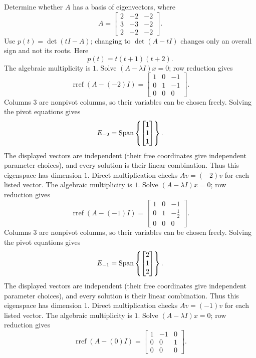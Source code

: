 \goal Determine whether $A$ has a basis of eigenvectors, where
\[A=\begin{bmatrix}2&-2&-2\\3&-3&-2\\2&-2&-2\end{bmatrix}.\]
Use $p(t)=\det(tI-A)$; changing to $\det(A-tI)$ changes only an overall sign and not its roots. Here
\[p(t)=t \left(t + 1\right) \left(t + 2\right).\]
The algebraic multiplicity is $1$. Solve $(A-\lambda I)x=0$; row reduction gives
\[\operatorname{rref}(A-(-2)I)=\begin{bmatrix}1&0&-1\\0&1&-1\\0&0&0\end{bmatrix}.\]
Columns 3 are nonpivot columns, so their variables can be chosen freely. Solving the pivot equations gives
\[E_{-2}=\operatorname{Span}\left\{\begin{bmatrix}1\\1\\1\end{bmatrix}\right\}.\]
The displayed vectors are independent (their free coordinates give independent parameter choices), and every solution is their linear combination. Thus this eigenspace has dimension $1$. Direct multiplication checks $Av=(-2)v$ for each listed vector.
The algebraic multiplicity is $1$. Solve $(A-\lambda I)x=0$; row reduction gives
\[\operatorname{rref}(A-(-1)I)=\begin{bmatrix}1&0&-1\\0&1&- \frac{1}{2}\\0&0&0\end{bmatrix}.\]
Columns 3 are nonpivot columns, so their variables can be chosen freely. Solving the pivot equations gives
\[E_{-1}=\operatorname{Span}\left\{\begin{bmatrix}2\\1\\2\end{bmatrix}\right\}.\]
The displayed vectors are independent (their free coordinates give independent parameter choices), and every solution is their linear combination. Thus this eigenspace has dimension $1$. Direct multiplication checks $Av=(-1)v$ for each listed vector.
The algebraic multiplicity is $1$. Solve $(A-\lambda I)x=0$; row reduction gives
\[\operatorname{rref}(A-(0)I)=\begin{bmatrix}1&-1&0\\0&0&1\\0&0&0\end{bmatrix}.\]
